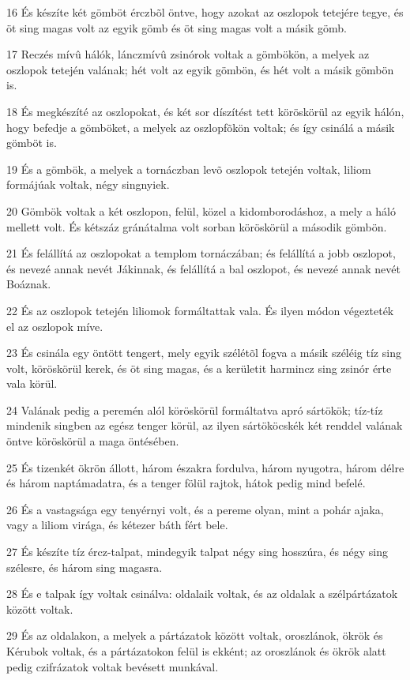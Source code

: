 \par 16 És készíte két gömböt érczbõl öntve, hogy azokat az oszlopok tetejére tegye, és öt sing magas volt az egyik gömb és öt sing magas volt a másik gömb.
\par 17 Reczés mívû hálók, lánczmívû zsinórok voltak a gömbökön, a melyek az oszlopok tetején valának; hét volt az egyik gömbön, és hét volt a másik gömbön is.
\par 18 És megkészíté az oszlopokat, és két sor díszítést tett köröskörül az egyik hálón, hogy befedje a gömböket, a melyek az oszlopfõkön voltak; és így csinálá a másik gömböt is.
\par 19 És a gömbök, a melyek a tornáczban levõ oszlopok tetején voltak, liliom formájúak voltak, négy singnyiek.
\par 20 Gömbök voltak a két oszlopon, felül, közel a kidomborodáshoz, a mely a háló mellett volt. És kétszáz gránátalma volt sorban köröskörül a második gömbön.
\par 21 És felállítá az oszlopokat a templom tornáczában; és felállítá a jobb oszlopot, és nevezé annak nevét Jákinnak, és felállítá a bal oszlopot, és nevezé annak nevét Boáznak.
\par 22 És az oszlopok tetején liliomok formáltattak vala. És ilyen módon végezteték el az oszlopok míve.
\par 23 És csinála egy öntött tengert, mely egyik szélétõl fogva a másik széléig tíz sing volt, köröskörül kerek, és öt sing magas, és a kerületit harmincz sing zsinór érte vala körül.
\par 24 Valának pedig a peremén alól köröskörül formáltatva apró sártökök; tíz-tíz mindenik singben az egész tenger körül, az ilyen sártököcskék két renddel valának öntve köröskörül a maga öntésében.
\par 25 És tizenkét ökrön állott, három északra fordulva, három nyugotra, három délre és három naptámadatra, és a tenger fölül rajtok, hátok pedig mind befelé.
\par 26 És a vastagsága egy tenyérnyi volt, és a pereme olyan, mint a pohár ajaka, vagy a liliom virága, és kétezer báth fért bele.
\par 27 És készíte tíz ércz-talpat, mindegyik talpat négy sing hosszúra, és négy sing szélesre, és három sing magasra.
\par 28 És e talpak így voltak csinálva: oldalaik voltak, és az oldalak a szélpártázatok között voltak.
\par 29 És az oldalakon, a melyek a pártázatok között voltak, oroszlánok, ökrök és Kérubok voltak, és a pártázatokon felül is ekként; az oroszlánok és ökrök alatt pedig czifrázatok voltak bevésett munkával.
